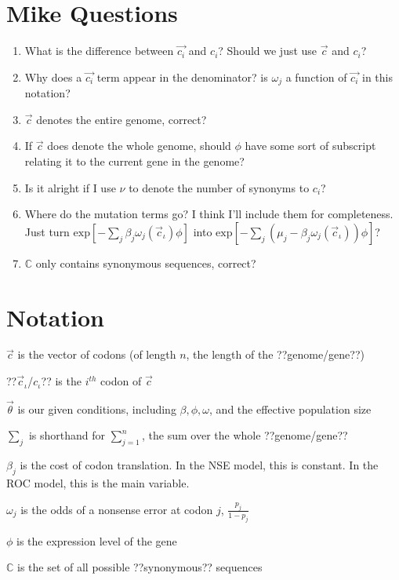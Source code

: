 \documentclass[11pt]{article} %
\begin{document}
\section{Mike Questions}
\begin{enumerate}
\item What is the difference between $\vec{c_i}$ and $c_i$? Should we just use $\vec{c}$ and $c_i$?
\item Why does a $\vec{c_i}$ term appear in the denominator? is $\omega_j$ a function of $\vec{c_i}$ in this notation?
\item $\vec{c}$ denotes the entire genome, correct?
\item If $\vec{c}$ does denote the whole genome, should $\phi$ have some sort of subscript relating it to the current gene in the genome?
\item Is it alright if I use $\nu$ to denote the number of synonyms to $c_i$?
\item Where do the mutation terms go? I think I'll include them for completeness. Just turn
$\mbox{exp}\left[-\sum_j \beta_j \omega_j (\vec{c}_\iota) \phi \right]$
into
$\mbox{exp}\left[-\sum_j (\mu_j - \beta_j \omega_j (\vec{c}_\iota)) \phi \right]$?
\item $\mathbb{C}$ only contains synonymous sequences, correct?
\end{enumerate}


\section{Notation}

$\vec{c}$ is the vector of codons (of length $n$, the length of the ??genome/gene??)

??$\vec{c}_\iota$/$c_\iota$?? is the $i^{th}$ codon of $\vec{c}$

$\vec{\theta}$ is our given conditions, including $\beta, \phi, \omega$, and the effective population size

$\sum_j$ is shorthand for $\sum_{j=1}^n$, the sum over the whole ??genome/gene??

$\beta_j$ is the cost of codon translation. In the NSE model, this is constant. In the ROC model, this is the main variable.

$\omega_j$ is the odds of a nonsense error at codon $j$, $\frac{p_j}{1-p_j}$ 

$\phi$ is the expression level of the gene

$\mathbb{C}$ is the set of all possible ??synonymous?? sequences
\end{document}

